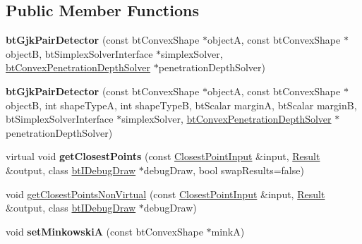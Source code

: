 \subsection*{Public Member Functions}
\begin{DoxyCompactItemize}
\item 
\mbox{\label{classbtGjkPairDetector_a57f8635def7c26f5eebada28c1e6f2e0}} 
{\bfseries bt\+Gjk\+Pair\+Detector} (const bt\+Convex\+Shape $\ast$objectA, const bt\+Convex\+Shape $\ast$objectB, bt\+Simplex\+Solver\+Interface $\ast$simplex\+Solver, \hyperlink{classbtConvexPenetrationDepthSolver}{bt\+Convex\+Penetration\+Depth\+Solver} $\ast$penetration\+Depth\+Solver)
\item 
\mbox{\label{classbtGjkPairDetector_a1de8180060fdf40cda4a00c9c9493c26}} 
{\bfseries bt\+Gjk\+Pair\+Detector} (const bt\+Convex\+Shape $\ast$objectA, const bt\+Convex\+Shape $\ast$objectB, int shape\+TypeA, int shape\+TypeB, bt\+Scalar marginA, bt\+Scalar marginB, bt\+Simplex\+Solver\+Interface $\ast$simplex\+Solver, \hyperlink{classbtConvexPenetrationDepthSolver}{bt\+Convex\+Penetration\+Depth\+Solver} $\ast$penetration\+Depth\+Solver)
\item 
\mbox{\label{classbtGjkPairDetector_a42505a0ccc728c82595febe9af3a3bc8}} 
virtual void {\bfseries get\+Closest\+Points} (const \hyperlink{structbtDiscreteCollisionDetectorInterface_1_1ClosestPointInput}{Closest\+Point\+Input} \&input, \hyperlink{structbtDiscreteCollisionDetectorInterface_1_1Result}{Result} \&output, class \hyperlink{classbtIDebugDraw}{bt\+I\+Debug\+Draw} $\ast$debug\+Draw, bool swap\+Results=false)
\item 
void \hyperlink{classbtGjkPairDetector_abc29953dd7aee59e9ca887963c26c8c2}{get\+Closest\+Points\+Non\+Virtual} (const \hyperlink{structbtDiscreteCollisionDetectorInterface_1_1ClosestPointInput}{Closest\+Point\+Input} \&input, \hyperlink{structbtDiscreteCollisionDetectorInterface_1_1Result}{Result} \&output, class \hyperlink{classbtIDebugDraw}{bt\+I\+Debug\+Draw} $\ast$debug\+Draw)
\item 
\mbox{\label{classbtGjkPairDetector_aa1c126f716f8c80f355ad48a5234ca73}} 
void {\bfseries set\+MinkowskiA} (const bt\+Convex\+Shape $\ast$minkA)
\item 
\mbox{\label{classbtGjkPairDetector_aee8fc2c182e482574ba9e819eea7b23a}} 

\end{DoxyCompactItemize}
